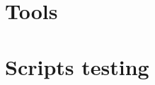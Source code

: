 \documentclass[epsfig,a4paper,11pt,titlepage,twoside,openany]{book}
\begin{document}
      
      
      \part{Tools}
      
      
      
      
      \part{Scripts testing}
      
      
      
      
      
      
    \endgroup
\end{document}
